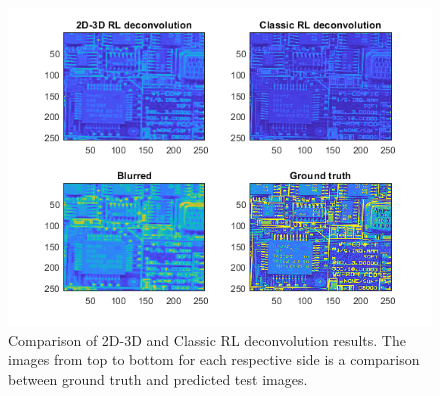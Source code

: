 \documentclass{article}
\begin{document}
\begin{figure}[!htb]
    \centering
\includegraphics[width=\textwidth]{figs/RL/2D_RLcompare.png}
    \caption{Comparison of 2D-3D and Classic RL deconvolution results. The images from top to bottom for each respective side is a comparison between ground truth and predicted test images.}
    \label{fig:RL2DCompare}
\end{figure}
\end{document}

